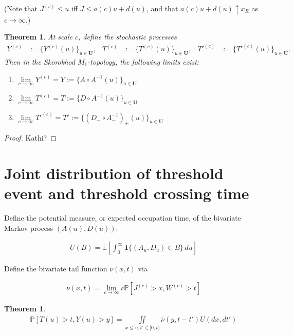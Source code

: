 \documentclass[12pt, a4paper]{article}
\newtheorem{theorem}[equation]{Theorem}
\newcommand{\ex}{\mathbb {E}}
\newcommand{\pr}{\mathbb {P}}
\newcommand{\1}{\mathbf 1}
\begin{document}
(Note that $J^{(c)} \le u$ iff $J \le a(c) u + d(u)$, and that 
$a(c) u + d(u) \uparrow x_R$ as $c \to \infty$.) 

\begin{theorem}
  At scale $c$, define the stochastic processes 
  \begin{align*}
    Y^{(c)} &:= \{Y^{(c)}(u)\}_{u \in \mathbf U}, 
    & T^{(c)} &:= \{T^{(c)}(u)\}_{u \in \mathbf U}, 
    & T'^{(c)} &:= \{T'^{(c)}(u)\}_{u \in \mathbf U}.
  \end{align*}
Then in the Skorokhod $M_1$-topology, the following limits exist:
  \begin{enumerate}
    \item 
    $\lim \limits_{c \to \infty} Y^{(c)} = Y := \{A \circ A^{-1}(u)\}_{u \in \mathbf U}$
    \item
    $\lim \limits_{c \to \infty} T^{(c)} = T := \{D \circ A^{-1}(u)\}_{u \in \mathbf U}$
    \item
    $\lim \limits_{c \to \infty} T'^{(c)} = T' 
    := \{(D_- \circ A^{-1}_-)_+(u)\}_{u \in \mathbf U}$
  \end{enumerate}
\end{theorem}

\begin{proof}
  Kathi?
\end{proof}



\section{Joint distribution of threshold event and threshold crossing time}

Define the potential measure, or expected occupation time, of the bivariate 
Markov process $(A(u),D(u))$:

\begin{align*}
U(B) = \ex \left[ \int_0^\infty \mathbf 1\{ (A_u, D_u) \in B\}\,du \right]
\end{align*}

Define the bivariate tail function $\overline \nu(x,t)$ via 

\begin{align}
\overline \nu(x,t) = \lim_{c \to \infty} c \pr [J^{(c)} > x, W^{(c)} > t]
\end{align}


\begin{theorem}
\begin{align}
\pr [T(u) > t, Y(u) > y]
= \iint\limits_{x \le u, t' \in [0,t)} \overline \nu(y, t - t') U(dx, dt')
\end{align}
\end{theorem}
\end{document}
